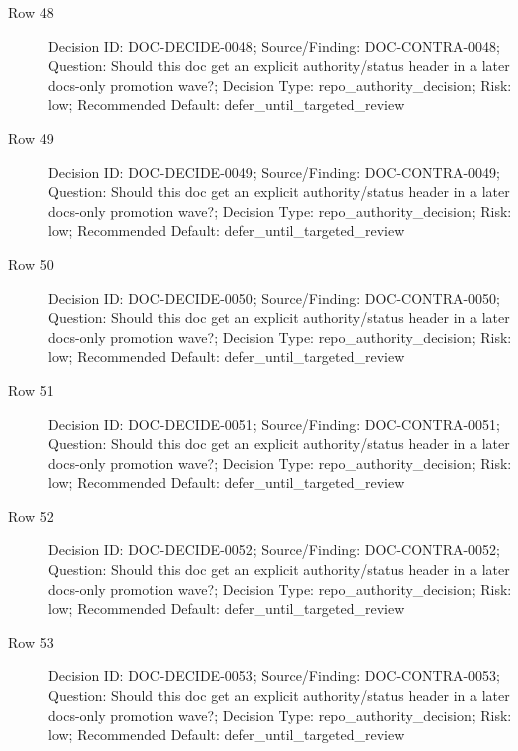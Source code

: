 \documentclass[9pt,a4paper,openany]{book}
\begin{document}
\begin{description}
\item[Row 48] Decision ID: DOC-\allowbreak{}DECIDE-\allowbreak{}0048; Source/\allowbreak{}Finding: DOC-\allowbreak{}CONTRA-\allowbreak{}0048; Question: Should this doc get an explicit authority/\allowbreak{}status header in a later docs-\allowbreak{}only promotion wave?; Decision Type: repo\_\allowbreak{}authority\_\allowbreak{}decision; Risk: low; Recommended Default: defer\_\allowbreak{}until\_\allowbreak{}targeted\_\allowbreak{}review
\item[Row 49] Decision ID: DOC-\allowbreak{}DECIDE-\allowbreak{}0049; Source/\allowbreak{}Finding: DOC-\allowbreak{}CONTRA-\allowbreak{}0049; Question: Should this doc get an explicit authority/\allowbreak{}status header in a later docs-\allowbreak{}only promotion wave?; Decision Type: repo\_\allowbreak{}authority\_\allowbreak{}decision; Risk: low; Recommended Default: defer\_\allowbreak{}until\_\allowbreak{}targeted\_\allowbreak{}review
\item[Row 50] Decision ID: DOC-\allowbreak{}DECIDE-\allowbreak{}0050; Source/\allowbreak{}Finding: DOC-\allowbreak{}CONTRA-\allowbreak{}0050; Question: Should this doc get an explicit authority/\allowbreak{}status header in a later docs-\allowbreak{}only promotion wave?; Decision Type: repo\_\allowbreak{}authority\_\allowbreak{}decision; Risk: low; Recommended Default: defer\_\allowbreak{}until\_\allowbreak{}targeted\_\allowbreak{}review
\item[Row 51] Decision ID: DOC-\allowbreak{}DECIDE-\allowbreak{}0051; Source/\allowbreak{}Finding: DOC-\allowbreak{}CONTRA-\allowbreak{}0051; Question: Should this doc get an explicit authority/\allowbreak{}status header in a later docs-\allowbreak{}only promotion wave?; Decision Type: repo\_\allowbreak{}authority\_\allowbreak{}decision; Risk: low; Recommended Default: defer\_\allowbreak{}until\_\allowbreak{}targeted\_\allowbreak{}review
\item[Row 52] Decision ID: DOC-\allowbreak{}DECIDE-\allowbreak{}0052; Source/\allowbreak{}Finding: DOC-\allowbreak{}CONTRA-\allowbreak{}0052; Question: Should this doc get an explicit authority/\allowbreak{}status header in a later docs-\allowbreak{}only promotion wave?; Decision Type: repo\_\allowbreak{}authority\_\allowbreak{}decision; Risk: low; Recommended Default: defer\_\allowbreak{}until\_\allowbreak{}targeted\_\allowbreak{}review
\item[Row 53] Decision ID: DOC-\allowbreak{}DECIDE-\allowbreak{}0053; Source/\allowbreak{}Finding: DOC-\allowbreak{}CONTRA-\allowbreak{}0053; Question: Should this doc get an explicit authority/\allowbreak{}status header in a later docs-\allowbreak{}only promotion wave?; Decision Type: repo\_\allowbreak{}authority\_\allowbreak{}decision; Risk: low; Recommended Default: defer\_\allowbreak{}until\_\allowbreak{}targeted\_\allowbreak{}review

\end{description}
\end{document}
